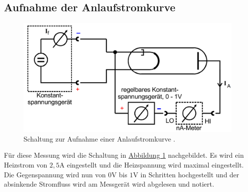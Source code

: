 \subsection{Aufnahme der Anlaufstromkurve}

\begin{figure}
    \centering
    \includegraphics[width=\textwidth]{pictures/Aufbau2.pdf}
    \caption{Schaltung zur Aufnahme einer Anlaufstromkurve \cite{v504}.}
    \label{fig:Aufbau2}
\end{figure}

Für diese Messung wird die Schaltung in \hyperref[fig:Aufbau2]{Abbildung \ref{fig:Aufbau2}} nachgebildet.
Es wird ein Heizstrom von $2,5 \unit\ampere$ eingestellt und die Heizspannung wird maximal eingestellt.
Die Gegenspannung wird nun von $0 \unit\volt$ bis $ 1 \unit\volt$ in Schritten hochgestellt
und der absinkende Stromfluss wird am Messgerät wird abgelesen und notiert.
